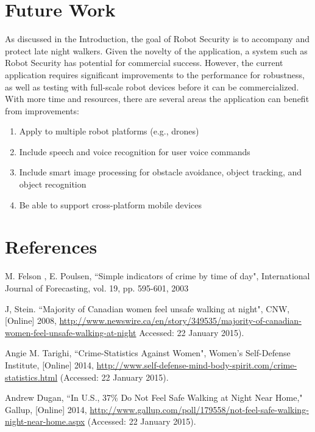 \documentclass[12pt]{article}
\begin{document}
\section{Future Work}
As discussed in the Introduction, the goal of Robot Security is to accompany and protect late night walkers. Given the novelty of the application, a system such as Robot Security has potential for commercial success. However, the current application requires significant improvements to the performance for robustness, as well as testing with full-scale robot devices before it can be commercialized.
With more time and resources, there are several areas the application can benefit from improvements:
\begin{enumerate}
\item Apply to multiple robot platforms (e.g., drones)
\item Include speech and voice recognition for user voice commands
\item Include smart image processing for obstacle avoidance, object tracking, and object recognition
\item Be able to support cross-platform mobile devices
\end{enumerate}

\section*{References}
\begin{enumerate}
\begin{sloppypar}
\item M. Felson , E. Poulsen, ``Simple indicators of crime by time of day", International Journal of Forecasting, vol. 19, pp. 595-601, 2003
\item J, Stein. ``Majority of Canadian women feel unsafe walking at night", CNW, [Online] 2008, \url{http://www.newswire.ca/en/story/349535/majority-of-canadian-women-feel-unsafe-walking-at-night} Accessed:  22 January 2015).
\item Angie M. Tarighi, ``Crime-Statistics Against Women", Women’s Self-Defense Institute, [Online] 2014, \url{http://www.self-defense-mind-body-spirit.com/crime-statistics.html} (Accessed:  22 January 2015).
\item Andrew Dugan, ``In U.S., 37\% Do Not Feel Safe Walking at Night Near Home," Gallup, [Online] 2014, \url{http://www.gallup.com/poll/179558/not-feel-safe-walking-night-near-home.aspx} (Accessed:  22 January 2015).
\end{sloppypar}
\end{enumerate}
\end{document}
